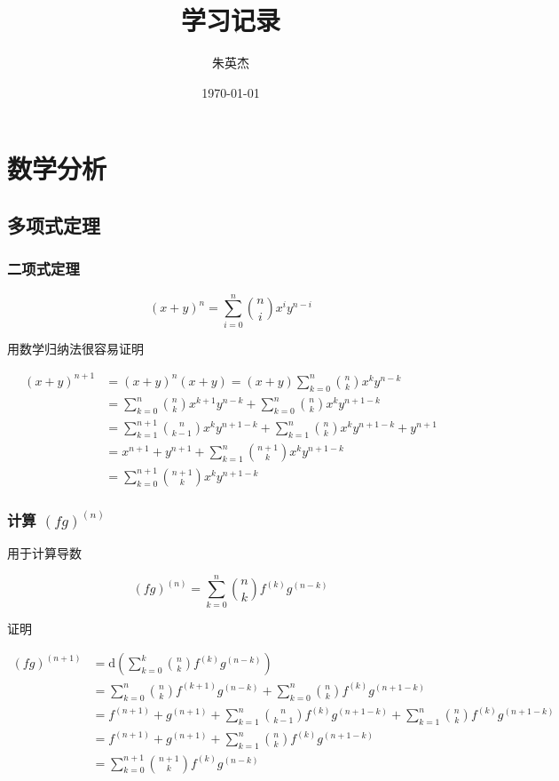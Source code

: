 \documentclass[12pt,a4paper]{ctexart}
\title{学习记录}
\author{朱英杰}
\date{\today}
\begin{document}
\maketitle
\tableofcontents

\section{数学分析}


\subsection{多项式定理}

\subsubsection{二项式定理}


\[
(x+y)^n = \sum_{i=0}^{n} \binom{n}{i}x^i y^{n-i}
\]

用数学归纳法很容易证明

\begin{align*}
(x+y)^{n+1} &= (x+y)^n(x+y) = (x+y)\sum_{k=0}^{n}\binom{n}{k}x^ky^{n-k} \\
&= \sum_{k=0}^{n}\binom{n}{k}x^{k+1}y^{n-k} + \sum_{k=0}^{n}\binom{n}{k}x^{k}y^{n+1-k} \\
&= \sum_{k=1}^{n+1}\binom{n}{k-1}x^{k}y^{n+1-k} + \sum_{k=1}^{n}\binom{n}{k}x^{k}y^{n+1-k}  + y^{n+1}\\ 
&= x^{n+1} + y^{n+1} + \sum_{k=1}^{n} \binom{n+1}{k}x^ky^{n+1-k} \\
&= \sum_{k=0}^{n+1} \binom{n+1}{k}x^ky^{n+1-k}
\end{align*}

\subsubsection{计算 $(fg)^{(n)}$}
用于计算导数

\[
(fg)^{(n)} = \sum_{k=0}^{n}\binom{n}{k}f^{(k)}g^{(n-k)}
\]

证明

\begin{align*}
    (fg)^{(n+1)} &= \text{d} \left( \sum_{k=0}^{k}\binom{n}{k}f^{(k)}g^{(n-k)} \right) \\
    &= \sum_{k=0}^{n}\binom{n}{k}f^{(k+1)}g^{(n-k)}  + \sum_{k=0}^{n}\binom{n}{k}f^{(k)}g^{(n+1-k)} \\
    &= f^{(n+1)} + g^{(n+1)} + \sum_{k=1}^{n}\binom{n}{k-1}f^{(k)}g^{(n+1-k)}  + \sum_{k=1}^{n}\binom{n}{k}f^{(k)}g^{(n+1-k)} \\
    &= f^{(n+1)} + g^{(n+1)} + \sum_{k=1}^{n}\binom{n}{k}f^{(k)}g^{(n+1-k)} \\
    &= \sum_{k=0}^{n+1}\binom{n+1}{k}f^{(k)}g^{(n-k)}
\end{align*}
\end{document}
